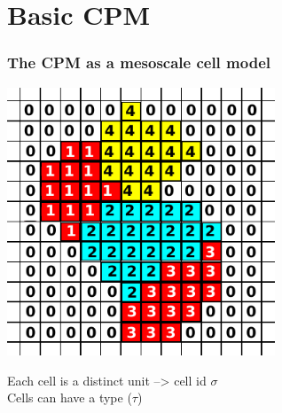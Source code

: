 \documentclass[compress]{beamer}
\begin{document}
 \section{Basic CPM}
 \begin{frame}
 \frametitle{The CPM as a mesoscale cell model}
 
 \begin{center}
  \includegraphics[width=0.6\textwidth]{figures/cpm_layout.pdf}\\
     \end{center}
 
Each cell is a distinct unit --> cell id $\sigma$\\ %
Cells can have a type ($\tau$)%

 \end{frame}
\end{document}
